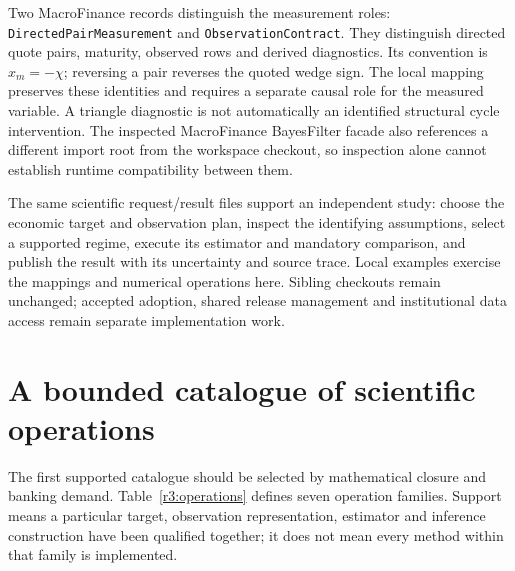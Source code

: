 Two MacroFinance records distinguish the measurement roles:
\texttt{DirectedPair\allowbreak Measurement} and
\texttt{Observation\allowbreak Contract}. They distinguish directed quote pairs, maturity,
observed rows and derived diagnostics. Its convention is $x_m=-\chi$;
reversing a pair reverses the quoted wedge sign. The local mapping preserves
these identities and requires a separate causal role for the measured
variable. A triangle diagnostic is not automatically an identified structural
cycle intervention. The inspected MacroFinance BayesFilter facade also
references a different import root from the workspace checkout, so inspection
alone cannot establish runtime compatibility between them.

The same scientific request/result files support an independent study:
choose the economic target and observation plan, inspect the identifying
assumptions, select a supported regime, execute its estimator and mandatory
comparison, and publish the result with its uncertainty and source trace.
Local examples exercise the mappings and numerical operations here. Sibling
checkouts remain unchanged; accepted adoption, shared release management and
institutional data access remain separate implementation work.




\section{A bounded catalogue of scientific operations}
\label{r3:operation-catalogue}

The first supported catalogue should be selected by mathematical closure
and banking demand. Table~\ref{r3:operations} defines seven operation
families. Support means a particular target, observation representation,
estimator and inference construction have been qualified together;
it does not mean every method within that family is implemented.

